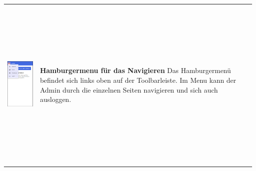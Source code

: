 \newpage

\begin{tabular}{C{6cm}  L{7cm}}
    \includegraphics[width=5cm,height=8.5cm]{bilder/prototyp UI Design/hamburgermenu_admininterface.png}                        & \textbf{Hamburgermenu für das Navigieren} \newline
    Das Hamburgermenü befindet sich links oben auf der Toolbarleiste. Im Menu kann der Admin durch die einzelnen
    Seiten navigieren und sich auch ausloggen.
\end{tabular}

